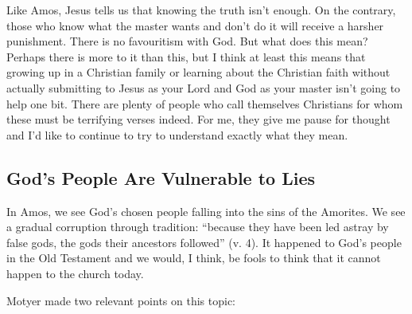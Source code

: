 Like Amos, Jesus tells us that knowing the truth isn't enough. On the contrary,
those who know what the master wants and don't do it will receive a harsher
punishment. There is no favouritism with God. But what does this mean? Perhaps
there is more to it than this, but I think at least this means that growing up
in a Christian family or learning about the Christian faith without actually
submitting to Jesus as your Lord and God as your master isn't going to help one
bit. There are plenty of people who call themselves Christians for whom these
must be terrifying verses indeed. For me, they give me pause for thought and I'd
like to continue to try to understand exactly what they mean.

\subsection{God's People Are Vulnerable to Lies}

In Amos, we see God's chosen people falling into the sins of the Amorites. We
see a gradual corruption through tradition: \enquote{because they have been led
astray by false gods, the gods their ancestors followed} (v. 4). It happened to
God's people in the Old Testament and we would, I think, be fools to think that
it cannot happen to the church today.

Motyer made two relevant points on this topic:

